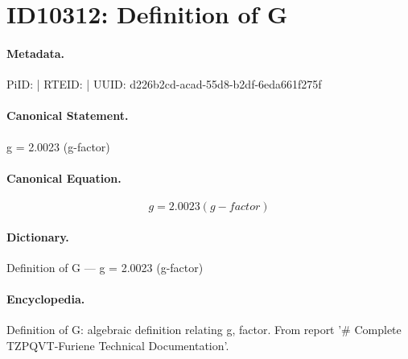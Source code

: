 \section*{ID10312: Definition of G}
\paragraph{Metadata.}
PiID:  | RTEID:  | UUID: d226b2cd-acad-55d8-b2df-6eda661f275f

\paragraph{Canonical Statement.}
g = 2.0023 (g-factor)

\paragraph{Canonical Equation.}
\[
g = 2.0023 (g-factor)
\]

\paragraph{Dictionary.}
Definition of G — g = 2.0023 (g-factor)

\paragraph{Encyclopedia.}
Definition of G: algebraic definition relating g, factor. From report '\# Complete TZPQVT-Furiene Technical Documentation'.
